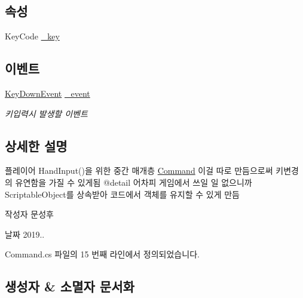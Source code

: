 \subsection*{속성}
\begin{DoxyCompactItemize}
\item 
Key\+Code \mbox{\hyperlink{class_command_a85e9adc5f9994f8da6b21bbad6dfb13d}{\+\_\+key}}
\end{DoxyCompactItemize}
\subsection*{이벤트}
\begin{DoxyCompactItemize}
\item 
\mbox{\hyperlink{class_command_acc714b5e0de57b7f24b2619fff860b9d}{Key\+Down\+Event}} \mbox{\hyperlink{class_command_a04f1a7e0dc8e999e0fca2aa9210f73a3}{\+\_\+event}}
\begin{DoxyCompactList}\small\item\em 키입력시 발생할 이벤트 \end{DoxyCompactList}\end{DoxyCompactItemize}


\subsection{상세한 설명}
플레이어 Hand\+Input()을 위한 중간 매개층 \mbox{\hyperlink{class_command}{Command}} 이걸 따로 만듬으로써 키변경의 유연함을 가질 수 있게됨 @detail 어차피 게임에서 쓰일 일 없으니까 Scriptable\+Object를 상속받아 코드에서 객체를 유지할 수 있게 만듬 

\begin{DoxyAuthor}{작성자}
문성후 
\end{DoxyAuthor}
\begin{DoxyDate}{날짜}
2019.. 
\end{DoxyDate}


Command.\+cs 파일의 15 번째 라인에서 정의되었습니다.



\subsection{생성자 \& 소멸자 문서화}
\mbox{\label{class_command_a0c5e5c63b6f555eb858aabe5b0f695f4}} 
